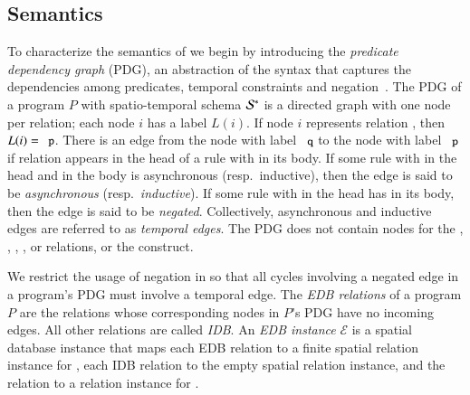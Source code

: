 


\subsection{Semantics}
\label{sec:semantics}
To characterize the semantics of \lang we begin by introducing the {\em predicate dependency graph} (PDG), an abstraction of the \lang syntax that
captures the dependencies among predicates, temporal constraints and negation~\cite{ullmanbook}.
The PDG of a \lang program $P$ with spatio-temporal schema $\mathcal{S}^*$ is a
directed graph with one node per relation; each node $i$ has a label $L(i)$.  If node $i$ represents relation , then $L(i) = \dedalus{p}$.  There is an edge from the node with label $\dedalus{q}$ to the node with label $\dedalus{p}$ if relation  appears in the head of a rule with  in its body.  If some rule with  in the head and  in the body is asynchronous (resp.\ inductive), then the edge is said to be {\em asynchronous} (resp.\ {\em inductive}).  If some rule with  in the head has  in its body, then the edge is said to be {\em negated}.  Collectively, asynchronous and inductive edges are referred to as {\em temporal edges}.  The PDG does not contain nodes for the , , , , or \dedalus{<} relations, or the  construct.

We restrict the usage of negation in \lang so that all cycles involving a negated edge in a \lang program's PDG must involve a temporal edge.
The {\em EDB relations} of a \lang program $P$ are the relations whose corresponding nodes in $P$'s PDG have no incoming edges.  All other relations are called {\em IDB}.
An {\em EDB instance} $\mathcal{E}$ is a spatial database instance that maps each EDB relation  to a finite spatial relation instance for , each IDB relation to the empty spatial relation instance, and the  relation to a relation instance for .

